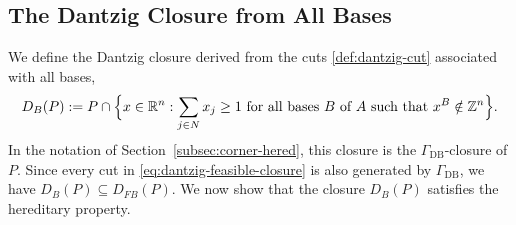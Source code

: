 \documentclass{article}
\newtheorem{corollary}{Corollary}
\newcommand{\Z}{\mathbb{Z}}
\newcommand{\R}{\mathbb{R}}
\newcommand{\red}[1]{{\color{red}{#1}}}
\begin{document}



\subsection{The Dantzig Closure from All Bases} \label{sec:dantzig}

We define the Dantzig closure derived from the cuts \eqref{def:dantzig-cut} associated with all bases,
\begin{align}
    D_{B}(P) := P \cap \Big\{x \in \R^n: \sum_{j \in N} x_j \geq 1 \text{ for all bases } B \text{ of } A \text{ such that } x^{B} \notin \Z^n \Big\}. \notag
\end{align}
In the notation of Section~\ref{subsec:corner-hered}, this closure is the $\Gamma_{\mathrm{DB}}$-closure of $P$.
Since every cut in \eqref{eq:dantzig-feasible-closure} is also generated by $\Gamma_{\mathrm{DB}}$, we have $D_{B}(P) \subseteq D_{FB}(P)$. We now show that the closure $D_{B}(P)$ satisfies the hereditary property.
\end{document}
